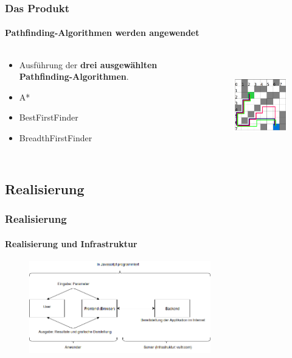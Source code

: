 \documentclass[professionalfont,serif,german]{beamer}
\begin{document}
\begin{frame}
  \frametitle{Das Produkt}
  \framesubtitle{Pathfinding-Algorithmen werden angewendet}
  \begin{columns}
    \begin{column}[T]{0.5\textwidth}
      \begin{itemize}
        \item Ausführung der \textbf{drei ausgewählten Pathfinding-Algorithmen}.
        \item \textcolor{pfblue}{A*}
        \item \textcolor{pfred}{BestFirstFinder}
        \item \textcolor{pfgreen}{BreadthFirstFinder}
      \end{itemize}
    \end{column}
    \begin{column}[T]{0.5\textwidth}
      \begin{figure}
        \includegraphics[height=4cm]{img/grid3.png}
      \end{figure}
    \end{column}
  \end{columns}
\end{frame}

\begin{frame}
  \section{Realisierung}
  \frametitle{Realisierung}
  \framesubtitle{Realisierung und Infrastruktur}
  \begin{figure}
    \includegraphics[height=4cm]{img/diagram1.png}
  \end{figure}
\end{frame}
\end{document}
